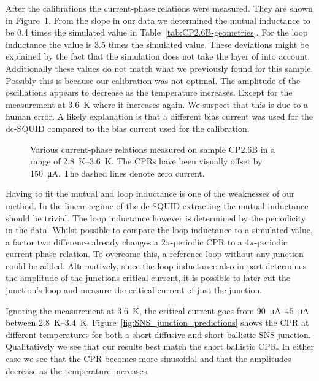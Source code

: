 After the calibrations the current-phase relations were measured. They are shown in Figure~\ref{fig:CP2.6B_revisited_CPRs}. From the slope in our data we determined the mutual inductance to be 0.4 times the simulated value in Table~\ref{tab:CP2.6B-geometries}. For the loop inductance the value is 3.5 times the simulated value. These deviations might be explained by the fact that the simulation does not take the layer of  into account. Additionally these values do not match what we previously found for this sample. Possibly this is because our calibration was not optimal. The amplitude of the oscillations appears to decrease as the temperature increases. Except for the measurement at \qty{3.6}{\kelvin} where it increases again. We suspect that this is due to a human error. A likely explanation is that a different bias current was used for the dc-SQUID compared to the bias current used for the calibration.

\begin{figure}[ht!]
	\centering
	
	\caption{Various current-phase relations measured on sample CP2.6B in a range of \qtyrange{2.8}{3.6}{\kelvin}. The CPRs have been visually offset by \qty{150}{\micro\ampere}. The dashed lines denote zero current.}
	\label{fig:CP2.6B_revisited_CPRs}
\end{figure}

Having to fit the mutual and loop inductance is one of the weaknesses of our method. In the linear regime of the dc-SQUID extracting the mutual inductance should be trivial. The loop inductance however is determined by the periodicity in the data. Whilst possible to compare the loop inductance to a simulated value, a factor two difference already changes a $2\pi$-periodic CPR to a $4\pi$-periodic current-phase relation. To overcome this, a reference loop without any junction could be added. Alternatively, since the loop inductance also in part determines the amplitude of the junctions critical current, it is possible to later cut the junction's loop and measure the critical current of just the junction.

Ignoring the measurement at \qty{3.6}{\kelvin}, the critical current goes from \qtyrange{90}{45}{\micro\ampere} between \qtyrange{2.8}{3.4}{\kelvin}. Figure~\ref{fig:SNS_junction_predictions} shows the CPR at different temperatures for both a short diffusive and short ballistic SNS junction. Qualitatively we see that our results best match the short ballistic CPR. In either case we see that the CPR becomes more sinusoidal and that the amplitudes decrease as the temperature increases.

